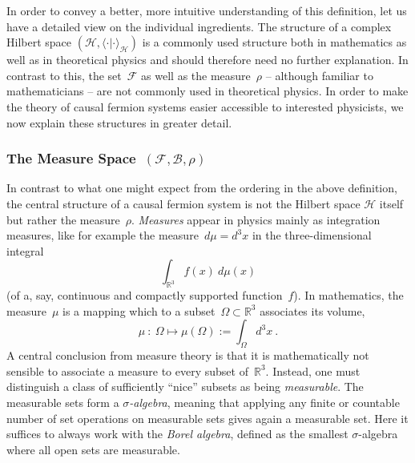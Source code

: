\documentclass[reqno,11pt]{amsart}
\numberwithin{equation}{section}
\newcommand{\la}{\langle}
\newcommand{\ra}{\rangle}
\newcommand{\R}{\mathbb{R}}
\newcommand{\1}{\mbox{\rm 1 \hspace{-1.05 em} 1}}
\renewcommand{\H}{\mathscr{H}}
\newcommand{\F}{{\mathscr{F}}}
\begin{document}
In order to convey a better, more intuitive understanding of this definition, let us have a detailed view on the individual ingredients. The structure of a complex Hilbert space $(\H,\la\cdot|\cdot\ra_\H)$ is a commonly used structure both in mathematics as well as in theoretical physics and should therefore need no further explanation. In contrast to this, the set~$\F$ as well as the measure~$\rho$ -- although familiar to mathematicians -- are 
not commonly used in theoretical physics. In order to make the theory of causal fermion systems easier accessible to interested physicists, we now explain these structures in greater detail.

\subsubsection{The Measure Space~$(\F, {\mathcal{B}}, \rho)$}
In contrast to what one might expect from the ordering in the above definition, the central
structure of a causal fermion system is not the Hilbert space $\H$ itself but rather the measure~$\rho$.
{\em{Measures}} appear in physics mainly as integration measures, like for example the measure~$d\mu = d^3x$
in the three-dimensional integral
\[ \int_{\R^3} f(x)\: d\mu(x) \]
(of a, say, continuous and compactly supported function~$f$).
In mathematics, the measure~$\mu$ is a mapping which to a subset~$\Omega \subset \R^3$ associates
its volume,
\[ \mu \::\: \Omega \mapsto \mu(\Omega) := \int_\Omega d^3x \:. \]
A central conclusion from measure theory is that it is mathematically not sensible to associate a measure
to every subset of~$\R^3$. Instead, one must distinguish a class of sufficiently ``nice'' subsets as being
{\em{measurable}}. The measurable sets form a {\em{$\sigma$-algebra}}, meaning that applying
any finite or countable number of set operations on measurable sets gives again a measurable set.
Here it suffices to always work with the {\em{Borel algebra}}, defined as the smallest $\sigma$-algebra
where all open sets are measurable.
\end{document}
